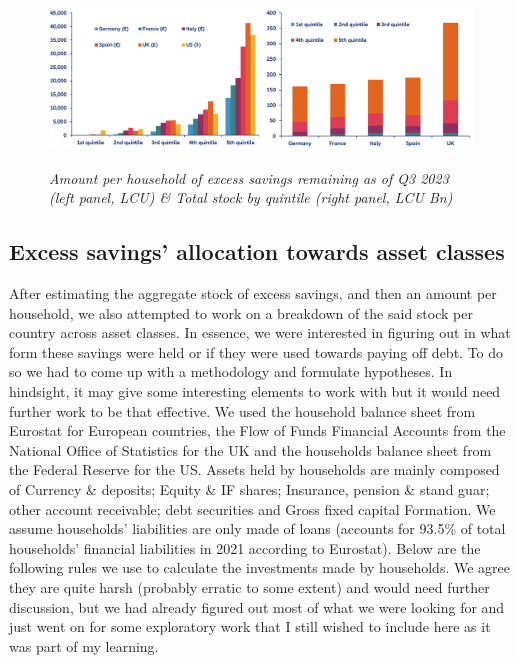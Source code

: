 \begin{figure}[H]
    \centering
    \caption{\textit{Amount per household of excess savings remaining as of Q3 2023 (left panel, LCU) \& Total stock by quintile (right panel, LCU Bn)}}
    \includegraphics[width=1\textwidth]{Core/1.Savings/img/xSavings.png}
    \label{figure:Savings}
\end{figure}

\newpage

\subsection{Excess savings' allocation towards asset classes}

After estimating the aggregate stock of excess savings, and then an amount per household, we also attempted to work on a breakdown of the said stock per country across asset classes. 
In essence, we were interested in figuring out in what form these savings were held or if they were used towards paying off debt. To do so we had to come up with a methodology and formulate hypotheses. 
In hindsight, it may give some interesting elements to work with but it would need further work to be that effective. 
We used the household balance sheet from Eurostat for European countries, the Flow of Funds Financial Accounts from the National Office of Statistics for the UK and the households balance sheet from the Federal Reserve for the US. 
Assets held by households are mainly composed of Currency \& deposits; Equity \& IF shares; Insurance, pension \& stand guar; other account receivable;	debt securities and Gross fixed capital Formation. We assume households’ liabilities are only made of loans (accounts for 93.5\% of total households' financial liabilities in 2021 according to Eurostat). 
Below are the following rules we use to calculate the investments made by households. We agree they are quite harsh (probably erratic to some extent) and would need further discussion, but we had already figured out most of what we were looking for and just went on for some exploratory work that I still wished to include here as it was part of my learning.

